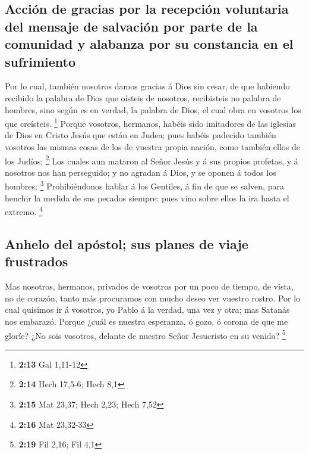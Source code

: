 \hypertarget{acciuxf3n-de-gracias-por-la-recepciuxf3n-voluntaria-del-mensaje-de-salvaciuxf3n-por-parte-de-la-comunidad-y-alabanza-por-su-constancia-en-el-sufrimiento}{%
\subsection{Acción de gracias por la recepción voluntaria del mensaje de
salvación por parte de la comunidad y alabanza por su constancia en el
sufrimiento}\label{acciuxf3n-de-gracias-por-la-recepciuxf3n-voluntaria-del-mensaje-de-salvaciuxf3n-por-parte-de-la-comunidad-y-alabanza-por-su-constancia-en-el-sufrimiento}}

 Por lo cual, también nosotros damos gracias á Dios sin
cesar, de que habiendo recibido la palabra de Dios que oísteis de
nosotros, recibisteis no palabra de hombres, sino según es en verdad, la
palabra de Dios, el cual obra en vosotros los que creísteis. \footnote{\textbf{2:13}
  Gal 1,11-12}  Porque vosotros, hermanos, habéis sido
imitadores de las iglesias de Dios en Cristo Jesús que están en Judea;
pues habéis padecido también vosotros las mismas cosas de los de vuestra
propia nación, como también ellos de los Judíos; \footnote{\textbf{2:14}
  Hech 17,5-6; Hech 8,1}  Los cuales aun mataron al Señor
Jesús y á sus propios profetas, y á nosotros nos han perseguido; y no
agradan á Dios, y se oponen á todos los hombres; \footnote{\textbf{2:15}
  Mat 23,37; Hech 2,23; Hech 7,52}  Prohibiéndonos hablar á
los Gentiles, á fin de que se salven, para henchir la medida de sus
pecados siempre: pues vino sobre ellos la ira hasta el extremo.
\footnote{\textbf{2:16} Mat 23,32-33}

\hypertarget{anhelo-del-apuxf3stol-sus-planes-de-viaje-frustrados}{%
\subsection{Anhelo del apóstol; sus planes de viaje
frustrados}\label{anhelo-del-apuxf3stol-sus-planes-de-viaje-frustrados}}

 Mas nosotros, hermanos, privados de vosotros por un poco
de tiempo, de vista, no de corazón, tanto más procuramos con mucho deseo
ver vuestro rostro.  Por lo cual quisimos ir á vosotros, yo
Pablo á la verdad, una vez y otra; mas Satanás nos embarazó.
 Porque ¿cuál es nuestra esperanza, ó gozo, ó corona de que
me gloríe? ¿No sois vosotros, delante de nuestro Señor Jesucristo en su
venida? \footnote{\textbf{2:19} Fil 2,16; Fil 4,1}

